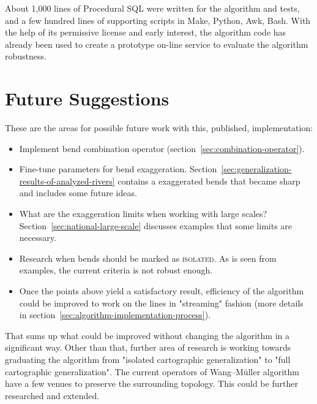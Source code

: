 \documentclass[a4paper]{article}
\newcommand{\WM}{Wang--M{\"u}ller}
\begin{document}
About 1,000 lines of Procedural SQL were written for the algorithm and tests,
and a few hundred lines of supporting scripts in Make, Python, Awk, Bash. With
the help of its permissive license and early interest, the algorithm code has
already been used to create a prototype on-line service to evaluate the
algorithm robustness.

\section{Future Suggestions}
\label{sec:future-suggestions}

These are the areas for possible future work with this, published,
implementation:

\begin{itemize}

    \item Implement bend combination operator
        (section~\ref{sec:combination-operator}).

    \item Fine-tune parameters for bend exaggeration.
        Section~\ref{sec:generalization-results-of-analyzed-rivers} contains
        a exaggerated bends that became sharp and includes some future ideas.

    \item What are the exaggeration limits when working with large scales?
        Section~\ref{sec:national-large-scale} discusses examples that some
        limits are necessary.

    \item Research when bends should be marked as \textsc{isolated}. As is
        seen from examples, the current criteria is not robust enough.

    \item Once the points above yield a satisfactory result, efficiency of the
        algorithm could be improved to work on the lines in "streaming" fashion
        (more details in section~\ref{sec:algorithm-implementation-process}).

\end{itemize}

That sums up what could be improved without changing the algorithm in a
significant way. Other than that, further area of research is working towards
graduating the algorithm from "isolated cartographic generalization" to "full
cartographic generalization".  The current operators of {\WM} algorithm have a
few venues to preserve the surrounding topology. This could be further
researched and extended.
\end{document}
